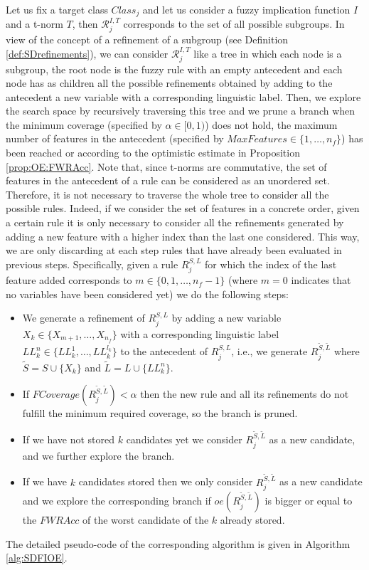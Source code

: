 Let us fix a target class $Class_j$ and let us consider a fuzzy implication function $I$ and a t-norm $T$, then $\mathcal{R}^{I,T}_j$ corresponds to the set of all possible subgroups. In view of the concept of a refinement of a subgroup (see Definition \ref{def:SDrefinements}), we can consider $\mathcal{R}^{I,T}_j$ like a tree in which each node is a subgroup, the root node is the fuzzy rule with an empty antecedent and each node has as children all the possible refinements obtained by adding to the antecedent a new variable with a corresponding linguistic label. Then, we explore the search space by recursively traversing this tree and we prune a branch when the minimum coverage (specified by $\alpha \in [0,1)$) does not hold, the maximum number of features in the antecedent (specified by $MaxFeatures \in \{1,\dots,n_f\}$) has been reached or according to the optimistic estimate in Proposition \ref{prop:OE:FWRAcc}. Note that, since t-norms are commutative, the set of features in the antecedent of a rule can be considered as an unordered set. Therefore, it is not necessary to traverse the whole tree to consider all the possible rules. Indeed, if we consider the set of features in a concrete order, given a certain rule it is only necessary to consider all the refinements generated by adding a new feature with a higher index than the last one considered. This way, we are only discarding at each step rules that have already been evaluated in previous steps. Specifically, given a rule $R_{j}^{S,L}$ for which the index of the last feature added corresponds to $m \in \{0,1,\dots,n_f-1\}$ (where $m=0$ indicates that no variables have been considered yet) we do the following steps:
\begin{itemize}
	\item We generate a refinement of $R_{j}^{S,L}$ by adding a new variable $X_k \in \{X_{m+1},\dots,X_{n_f}\}$ with a corresponding linguistic label $LL_{k}^{n} \in \{LL_{k}^1,\dots, LL_{k}^{l_k}\}$ to the antecedent of  $R_{j}^{S,L}$, i.e., we generate $R_{j}^{\tilde{S},\tilde{L}}$ where $\tilde{S} = S \cup \{X_k\}$ and $\tilde{L} = L \cup \{LL_k^{n}\}$.
	\item If $FCoverage(R_{j}^{\tilde{S},\tilde{L}})<\alpha$ then the new rule and all its refinements do not fulfill the minimum required coverage, so the branch is pruned.
	\item If we have not stored $k$ candidates yet we consider $R_{j}^{\tilde{S},\tilde{L}}$  as a new candidate, and we further explore the branch.
	\item If we have $k$ candidates stored then we only consider $R_{j}^{\tilde{S},\tilde{L}}$ as a new candidate and we explore the corresponding branch if $oe(R_{j}^{\tilde{S},\tilde{L}})$ is bigger or equal to the $FWRAcc$ of the worst candidate of the $k$ already stored.
\end{itemize}
\noindent The detailed pseudo-code of the corresponding algorithm is given in Algorithm \ref{alg:SDFIOE}.

